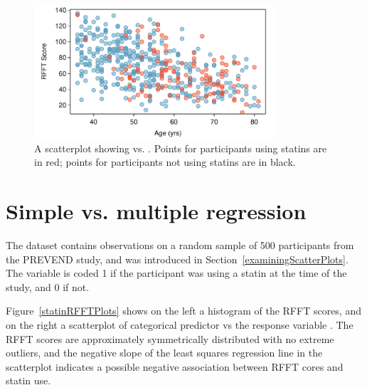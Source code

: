 \begin{figure}[h!]
	\centering
	\includegraphics[width=0.8\textwidth]
	{ch_multiple_linear_regression_oi_biostat/figures/statinAgeRFFTConfounderPlot/statinAgeRFFTConfounderPlot}
	\caption{A scatterplot showing  vs. . Points for participants using statins are in red; points for participants not using statins are in black.}
	\label{statinAgeRFFTConfounderPlot}
\end{figure}

\section{Simple vs. multiple regression}
\label{simpleVsMultipleRegression}

The dataset  contains observations on a random sample of 500 participants from the PREVEND study, and was introduced in Section~\ref{examiningScatterPlots}.  The variable  is coded 1 if the participant was using a statin at the time of the study, and 0 if not.  

Figure~\ref{statinRFFTPlots} shows on the left a histogram of the RFFT scores, and on the right a scatterplot of categorical predictor  vs the response variable .  The RFFT scores are approximately  symmetrically distributed with no extreme outliers, and the negative slope of the least squares regression line in the scatterplot indicates a possible negative association between RFFT cores and statin use.


